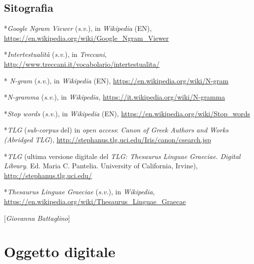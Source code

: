 \section*{Sitografia}
{\parindent0pt 
*\emph{Google Ngram Viewer} (\emph{s.v.}), in \emph{Wikipedia} (EN),
\url{https://en.wikipedia.org/wiki/Google_Ngram_Viewer}

*\emph{Intertestualità} (\emph{s.v.}), in \emph{Treccani},
\url{http://www.treccani.it/vocabolario/intertestualita/}

* \emph{N-gram} (\emph{s.v}.), in \emph{Wikipedia} (EN),
\url{https://en.wikipedia.org/wiki/N-gram}

*\emph{N-gramma} (\emph{s.v.}), in \emph{Wikipedia,}
\url{https://it.wikipedia.org/wiki/N-gramma}

*\emph{Stop words} (\emph{s.v.}), in \emph{Wikipedia} (EN),
\url{https://en.wikipedia.org/wiki/Stop_words}

*\emph{TLG} (\emph{sub-corpus} del) in \emph{open access}: \emph{Canon
of Greek Authors and Works (Abridged TLG}),
\url{http://stephanus.tlg.uci.edu/Iris/canon/csearch.jsp}

*\emph{TLG} (ultima versione digitale del \emph{TLG: Thesaurus Linguae
Graeciae. Digital Library}. Ed. Maria C. Pantelia. University of
California, Irvine),
\url{http://stephanus.tlg.uci.edu/}

*\emph{Thesaurus Linguae Graeciae} (\emph{s.v.}), in \emph{Wikipedia},
\url{https://en.wikipedia.org/wiki/Thesaurus_Linguae_Graecae}

}

\hrulefill 

{[}\emph{Giovanna Battaglino}{]}

\chapter{Oggetto digitale}

